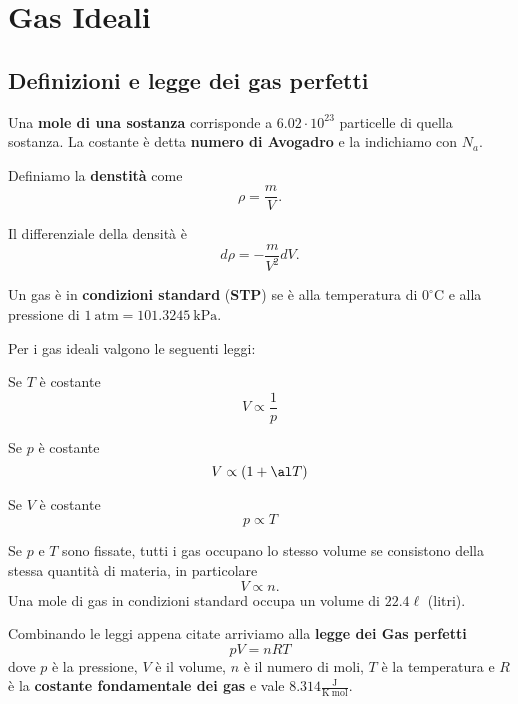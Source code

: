 \chapter{Gas Ideali}

\section{Definizioni e legge dei gas perfetti}
\begin{definition}[Mole]
Una \textbf{mole di una sostanza} corrisponde a $6.02\cdot 10^{23}$ particelle di quella sostanza. La costante \`e detta \textbf{numero di Avogadro} e la indichiamo con $N_a$. 
\end{definition}

\begin{definition}[Densit\`a]
Definiamo la \textbf{denstit\`a} come
\[\rho=\frac mV.\]
\end{definition}
\begin{remark}
Il differenziale della densit\`a \`e
\[d\rho=-\frac m{V^2}dV.\]
\end{remark}

\begin{definition}
Un gas \`e in \textbf{condizioni standard} (\textbf{STP}) se \`e alla temperatura di $0^\circ\mathrm C$ e alla pressione di $1\ \mathrm{atm}=101.3245\ \mathrm{kPa}$.
\end{definition}

\noindent Per i gas ideali valgono le seguenti leggi:
\begin{fact}
Se $T$ \`e costante
\[V\propto \frac1p\]
\end{fact}
\begin{fact}
Se $p$ \`e costante
\[V\propto (1+\al T)\]
\end{fact}
\begin{fact}
Se $V$ \`e costante
\[p\propto T\]
\end{fact}
\begin{fact}
Se $p$ e $T$ sono fissate, tutti i gas occupano lo stesso volume se consistono della stessa quantit\`a di materia, in particolare
\[V\propto n.\]
Una mole di gas in condizioni standard occupa un volume di $22.4\ell$ (litri).
\end{fact}

\noindent Combinando le leggi appena citate arriviamo alla \textbf{legge dei Gas perfetti}
\[\boxed{pV=nRT}\]
dove $p$ \`e la pressione, $V$ \`e il volume, $n$ \`e il numero di moli, $T$ \`e la temperatura e $R$ \`e la \textbf{costante fondamentale dei gas} e vale $8.314 \frac{\mathrm{J}}{\mathrm{K}\ \mathrm{mol}}$.

